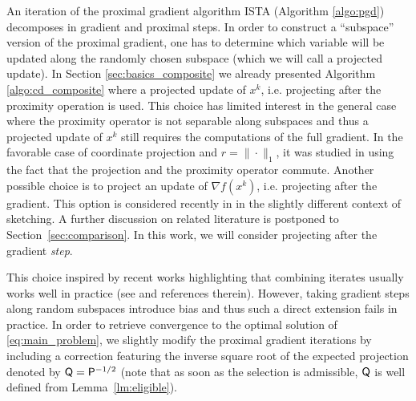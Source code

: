 An iteration of the proximal gradient algorithm ISTA (Algorithm \ref{algo:pgd}) decomposes in gradient and proximal steps. In order to construct a ``subspace'' version of the proximal gradient, one has to determine which variable will be updated along the randomly chosen subspace (which we will call a projected update). In Section \ref{sec:basics_composite} we already presented Algorithm \ref{algo:cd_composite} where a projected update of $x^k$,  i.e. projecting after the proximity operation is used. This choice has limited interest in the general case where the proximity operator is not separable along subspaces and thus a projected update of $x^k$ still requires the computations of the full gradient. In the favorable case of coordinate projection and $r=\|\cdot\|_1$, it was studied in \cite{qu2016coordinate} using the fact that the projection and the proximity operator commute. Another possible choice is to project an update of $\nabla f(x^k)$,  i.e. projecting after the gradient. This option is considered recently in \cite{hanzely2018sega} in the slightly different context of sketching. A further discussion on related literature is postponed to Section~\ref{sec:comparison}. In this work, we will consider projecting after the gradient \emph{step}.

This choice inspired by recent works highlighting that combining iterates usually works well in practice (see \cite{mishchenko2018} and references therein). However, taking gradient steps along random subspaces introduce bias and thus such a direct extension fails in practice. In order to retrieve convergence to the optimal solution of \eqref{eq:main_problem}, we slightly modify the proximal gradient iterations by including a correction featuring the inverse square root of the expected projection denoted by $ {\mathsf{Q}}= {\mathsf{P}}^{-1/2}$ (note that as soon as the selection is admissible, $ {\mathsf{Q}}$ is well defined from Lemma~\ref{lm:eligible}).

